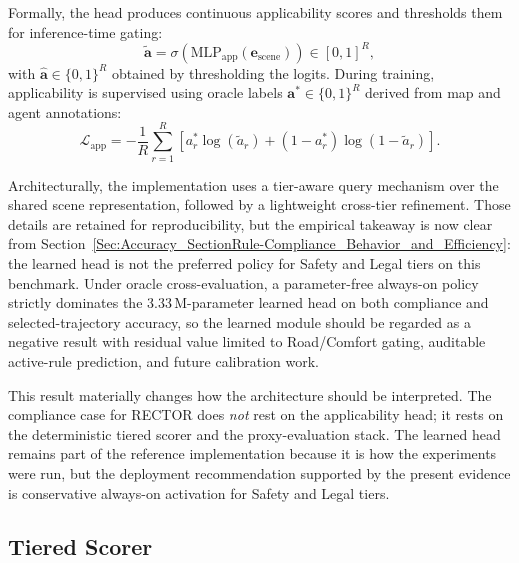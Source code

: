 Formally, the head produces continuous applicability scores and thresholds them for inference-time gating:
\begin{equation}
\label{eq:app_head_shorthand}
\tilde{\mathbf{a}}=\sigma\!\left(\text{MLP}_{\text{app}}(\mathbf{e}_{\text{scene}})\right)\in[0,1]^R,
\end{equation}
with $\hat{\mathbf{a}}\in\{0,1\}^R$ obtained by thresholding the logits.  During training, applicability is supervised using oracle labels $\mathbf{a}^*\in\{0,1\}^R$ derived from map and agent annotations:
\begin{equation}
\mathcal{L}_{\text{app}}=-\frac{1}{R}\sum_{r=1}^{R}\left[a_r^*\log(\tilde{a}_r)+(1-a_r^*)\log(1-\tilde{a}_r)\right].
\end{equation}

Architecturally, the implementation uses a tier-aware query mechanism over the shared scene representation, followed by a lightweight cross-tier refinement.  Those details are retained for reproducibility, but the empirical takeaway is now clear from Section~\ref{Sec:Accuracy_SectionRule-Compliance_Behavior_and_Efficiency}: the learned head is not the preferred policy for Safety and Legal tiers on this benchmark.  Under oracle cross-evaluation, a parameter-free always-on policy strictly dominates the 3.33\,M-parameter learned head on both compliance and selected-trajectory accuracy, so the learned module should be regarded as a negative result with residual value limited to Road/Comfort gating, auditable active-rule prediction, and future calibration work.

This result materially changes how the architecture should be interpreted.  The compliance case for RECTOR does \emph{not} rest on the applicability head; it rests on the deterministic tiered scorer and the proxy-evaluation stack.  The learned head remains part of the reference implementation because it is how the experiments were run, but the deployment recommendation supported by the present evidence is conservative always-on activation for Safety and Legal tiers.

\subsection{Tiered Scorer}
\label{subsec:tiered_scorer}

